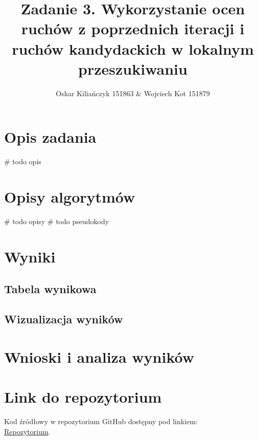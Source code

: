 \documentclass[11pt]{article}
\title{Zadanie 3. Wykorzystanie ocen ruchów z poprzednich iteracji i ruchów
kandydackich w lokalnym przeszukiwaniu}
\author{Oskar Kiliańczyk 151863 \& Wojciech Kot 151879}
\date{}
\begin{document}
\maketitle
\newpage

\section{Opis zadania}\label{sec:opis-zadania}

# todo opis

\section{Opisy algorytmów}\label{sec:opisy-alg}

# todo opisy
# todo pseudokody

\section{Wyniki}\label{sec:wyniki}

\subsection{Tabela wynikowa}\label{subsec:tabela-wynikowa}

\subsection{Wizualizacja wyników}\label{subsec:wizualizacja-wynikow}

\section{Wnioski i analiza wyników}\label{sec:wnioski}


\section{Link do repozytorium}\label{sec:link-do-repo}
Kod źródłowy w repozytorium GitHub dostępny pod linkiem: \\
\href{https://github.com/mojerepoxDfajnylink/}{Repozytorium}.
\end{document}
